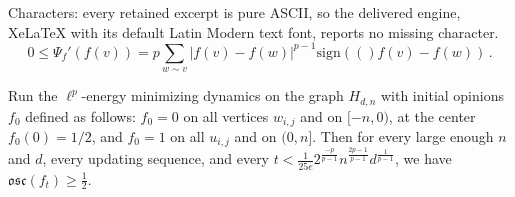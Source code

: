 \documentclass[10pt,a4paper]{amsart}
\newcommand{\osc}{\mathfrak{osc}}
\newcommand{\sign}[1]{\mathrm{sign}(#1)}
\begin{document}
Characters: every retained excerpt is pure ASCII, so the delivered engine, XeLaTeX with its default Latin Modern text font, reports no missing character.
\begin{equation} \label{eq:psuper}
0 \le \Psi_f'(f(v))=p\sum_{w \sim v}|f(v)-f(w)|^{p-1}\sign(f(v)-f(w)) \,.
\end{equation}

    \begin{thm}
        Run the $\ell^p$-energy minimizing dynamics on the graph $H_{d,n}$ with initial opinions $f_0$ defined as follows:  $f_0=0$  on all vertices $w_{i,j}$ and on $[-n,0)$, at the center $f_0(0)=1/2$,  and     $f_0=1$ on  all $u_{i,j}$ and on $(0,n]$.  Then for every large enough $n$ and $d$, every updating sequence, and every $t<\frac{1}{25e} 2^\frac{-p}{p-1}n^\frac{2p-1}{p-1}d^\frac{1}{p-1}$,  we have $\osc(f_t)\geq \frac{1}{2}$.
    \end{thm}
\end{document}
